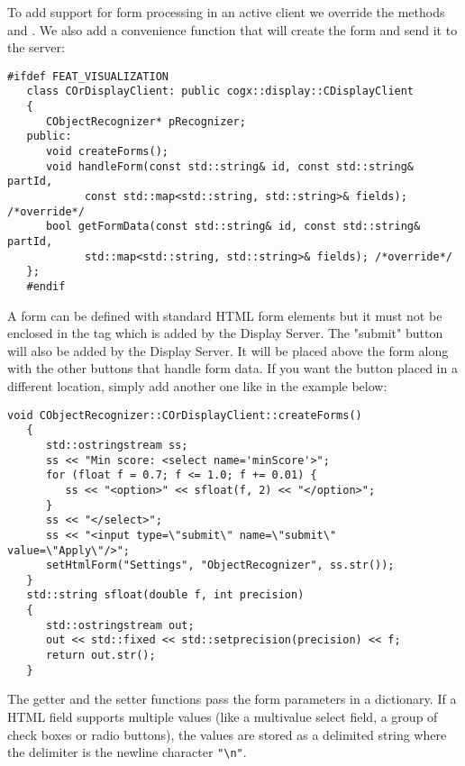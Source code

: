 To add support for form processing in an active client we override the methods
 and . We also add a convenience
function that will create the form and send it to the server:

\begin{Verbatim}[fontsize=\scriptsize,gobble=3]
   #ifdef FEAT_VISUALIZATION
   class COrDisplayClient: public cogx::display::CDisplayClient
   {
      CObjectRecognizer* pRecognizer;
   public:
      void createForms();
      void handleForm(const std::string& id, const std::string& partId,
            const std::map<std::string, std::string>& fields); /*override*/
      bool getFormData(const std::string& id, const std::string& partId,
            std::map<std::string, std::string>& fields); /*override*/
   };
   #endif
\end{Verbatim}

A form can be defined with standard HTML form elements but it must not be
enclosed in the  tag which is added by the Display Server.  The
"submit" button will also be added by the Display Server.  It will be placed
above the form along with the other buttons that handle form data.  If you want
the button placed in a different location, simply add another one like in the
example below:

\begin{Verbatim}[fontsize=\scriptsize,gobble=3]
   void CObjectRecognizer::COrDisplayClient::createForms()
   {
      std::ostringstream ss;
      ss << "Min score: <select name='minScore'>";
      for (float f = 0.7; f <= 1.0; f += 0.01) {
         ss << "<option>" << sfloat(f, 2) << "</option>";
      }
      ss << "</select>";
      ss << "<input type=\"submit\" name=\"submit\" value=\"Apply\"/>";
      setHtmlForm("Settings", "ObjectRecognizer", ss.str());
   }
   std::string sfloat(double f, int precision)
   {
      std::ostringstream out;
      out << std::fixed << std::setprecision(precision) << f;
      return out.str();
   }
\end{Verbatim}

The getter and the setter functions pass the form parameters in a dictionary.
If a HTML field supports multiple values (like a multivalue select field, a
group of check boxes or radio buttons), the values are stored as a delimited
string where the delimiter is the newline character \Verb|"\n"|.

